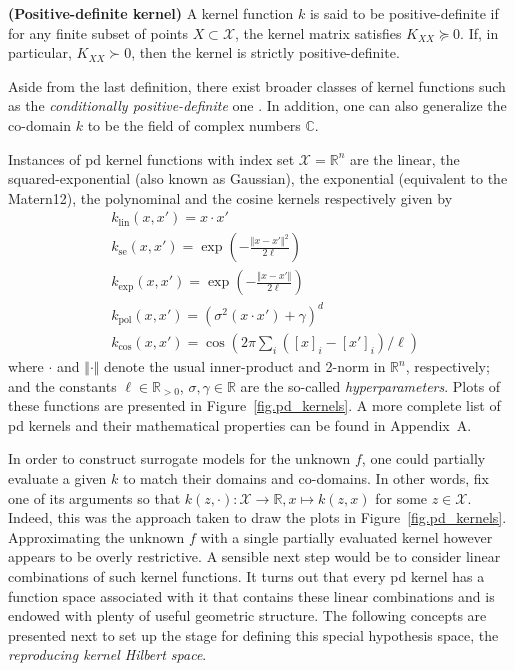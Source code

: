 \begin{definition}
	\label{def.pd_kernel}
	\textbf{(Positive-definite kernel)} A kernel function $k$ is said to be positive-definite if for any finite subset of points $X \subset \mathcal{X}$, the kernel matrix satisfies $K_{XX} \succeq 0$. If, in particular, $K_{XX} \succ 0$, then the kernel is strictly positive-definite.
\end{definition}

\begin{remark}
	Aside from the last definition, there exist broader classes of kernel functions such as the \textit{conditionally positive-definite} one \cite[§2.4]{scholkopf2002learning}\cite[§8]{wendland2004scattered}. In addition, one can also generalize the co-domain $k$ to be the field of complex numbers $\mathbb{C}$.
\end{remark}

Instances of \ac{pd} kernel functions with index set $\mathcal{X} = \mathbb{R}^n$ are the linear, the squared-exponential (also known as Gaussian), the exponential (equivalent to the Matern12), the polynominal and the cosine kernels respectively given by
\begin{align}
	&k_\text{lin}(x,x') = x \cdot x' \\
	&k_\text{se}(x,x') = \exp\left(-\frac{\Vert x-x'\Vert^2}{2\ell}\right) \label{eq.se_kernel}\\
	&k_\text{exp}(x,x') = \exp\left(-\frac{\Vert x-x'\Vert}{2\ell}\right) \\
	&k_\text{pol}(x,x') = \left(\sigma^2 (x \cdot x') + \gamma \right)^d \\
	&k_\text{cos}(x,x') = \cos\left(2\pi \sum_i ([x]_i-[x']_i)/\ell \right)
\end{align}
where $\cdot$ and $\Vert \cdot \Vert$ denote the usual inner-product  and 2-norm in $\mathbb{R}^n$, respectively; and the constants $\ell \in \mathbb{R}_{>0}$, $\sigma, \gamma\in \mathbb{R}$ are the so-called \textit{hyperparameters}. Plots of these functions are presented in Figure~\ref{fig.pd_kernels}. A more complete list of \ac{pd} kernels and their mathematical properties can be found in Appendix~A. 

In order to construct surrogate models for the unknown $f$, one could partially evaluate a given $k$ to match their domains and co-domains. In other words, fix one of its arguments so that $k(z,\cdot): \mathcal{X} \rightarrow \mathbb{R}, x \mapsto k(z,x)$ for some $z \in \mathcal{X}$. Indeed, this was the approach taken to draw the plots in Figure~\ref{fig.pd_kernels}. Approximating the unknown $f$ with a single partially evaluated kernel however appears to be overly restrictive. A sensible next step would be to consider linear combinations of such kernel functions. It turns out that every \ac{pd} kernel has a function space associated with it that contains these linear combinations and is endowed with plenty of useful geometric structure. The following concepts are presented next to set up the stage for defining this special hypothesis space, the \textit{reproducing kernel Hilbert space}.

